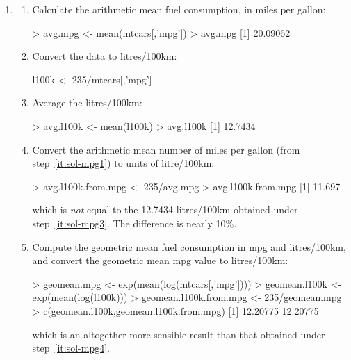 \begin{enumerate}
\item
  \begin{enumerate}
  \item\label{it:sol-mpg1} Calculate the arithmetic mean fuel
    consumption, in miles per gallon:

\begin{console}
> avg.mpg <- mean(mtcars[,'mpg'])
> avg.mpg
[1] 20.09062
\end{console}

\item\label{it:sol-mpg2} Convert the data to litres/100km:

\begin{console}
l100k <- 235/mtcars[,'mpg']
\end{console}

\item\label{it:sol-mpg3} Average the litres/100km:

\begin{console}
> avg.l100k <- mean(l100k)
> avg.l100k
[1] 12.7434
\end{console}

\item\label{it:sol-mpg4} Convert the arithmetic mean number of miles
  per gallon (from step~\ref{it:sol-mpg1}) to units of litre/100km.

\begin{console}
> avg.l100k.from.mpg <- 235/avg.mpg
> avg.l100k.from.mpg
[1] 11.697
\end{console}

\noindent which is \emph{not} equal to the 12.7434 litres/100km
obtained under step~\ref{it:sol-mpg3}. The difference is nearly 10\%.

\item\label{it:sol-mpg5} Compute the geometric mean fuel consumption
  in mpg and litres/100km, and convert the geometric mean mpg value to
  litres/100km:
  
\begin{console}
> geomean.mpg <- exp(mean(log(mtcars[,'mpg'])))
> geomean.l100k <- exp(mean(log(l100k)))
> geomean.l100k.from.mpg <- 235/geomean.mpg
> c(geomean.l100k,geomean.l100k.from.mpg)
[1] 12.20775 12.20775
\end{console}

\noindent which is an altogether more sensible result than that
obtained under step~\ref{it:sol-mpg4}.

\end{enumerate}


\end{enumerate}
